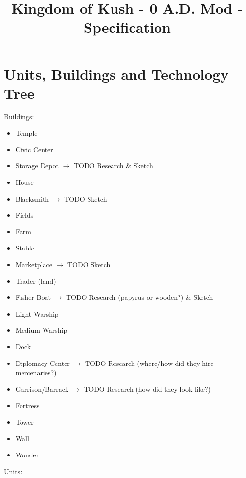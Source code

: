 \documentclass[a4paper,12pt]{scrreprt}
\title{Kingdom of Kush - 0 A.D. Mod - Specification}
\begin{document}
\maketitle


\tableofcontents

\chapter{Units, Buildings and Technology Tree}

Buildings:

\begin{itemize}
	\item Temple
	\item Civic Center
	\item Storage Depot $\rightarrow$ TODO Research \& Sketch
	\item House
	\item Blacksmith $\rightarrow$ TODO Sketch
	\item Fields
	\item Farm
	\item Stable
	\item Marketplace $\rightarrow$ TODO Sketch
	\item Trader (land)
	\item Fisher Boat $\rightarrow$ TODO Research (papyrus or wooden?) \& Sketch
	\item Light Warship
	\item Medium Warship
	\item Dock
	\item Diplomacy Center $\rightarrow$ TODO Research (where/how did they hire mercenaries?)
	\item Garrison/Barrack $\rightarrow$ TODO Research (how did they look like?)
	\item Fortress
	\item Tower
	\item Wall
	\item Wonder
\end{itemize}

Units:
\end{document}
